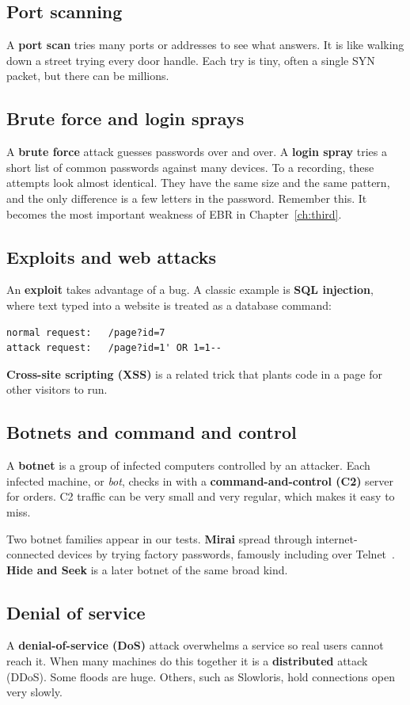 \subsection{Port scanning}
A \textbf{port scan} tries many ports or addresses to see what answers. It is like walking down a street trying every door handle. Each try is tiny, often a single SYN packet, but there can be millions.

\subsection{Brute force and login sprays}
A \textbf{brute force} attack guesses passwords over and over. A \textbf{login spray} tries a short list of common passwords against many devices. To a recording, these attempts look almost identical. They have the same size and the same pattern, and the only difference is a few letters in the password. Remember this. It becomes the most important weakness of EBR in Chapter~\ref{ch:third}.

\subsection{Exploits and web attacks}
An \textbf{exploit} takes advantage of a bug. A classic example is \textbf{SQL injection}, where text typed into a website is treated as a database command:
\begin{lstlisting}
normal request:   /page?id=7
attack request:   /page?id=1' OR 1=1--
\end{lstlisting}
\textbf{Cross-site scripting (XSS)} is a related trick that plants code in a page for other visitors to run.

\subsection{Botnets and command and control}
A \textbf{botnet} is a group of infected computers controlled by an attacker. Each infected machine, or \emph{bot}, checks in with a \textbf{command-and-control (C2)} server for orders. C2 traffic can be very small and very regular, which makes it easy to miss.

Two botnet families appear in our tests. \textbf{Mirai} spread through internet-connected devices by trying factory passwords, famously including over Telnet~\cite{mirai}. \textbf{Hide and Seek} is a later botnet of the same broad kind.

\subsection{Denial of service}
A \textbf{denial-of-service (DoS)} attack overwhelms a service so real users cannot reach it. When many machines do this together it is a \textbf{distributed} attack (DDoS). Some floods are huge. Others, such as Slowloris, hold connections open very slowly.

